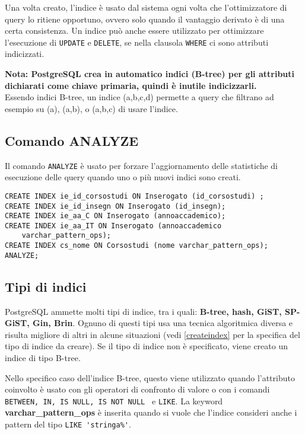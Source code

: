 \documentclass[a4paper, 10pt, titlepage]{article}
\begin{document}
	Una volta creato, l'indice è usato dal sistema ogni volta che l'ottimizzatore di query lo ritiene opportuno, ovvero solo quando il vantaggio derivato è di una certa consistenza. Un indice può anche essere utilizzato per ottimizzare l'esecuzione di \lstinline|UPDATE| e \lstinline|DELETE|, se nella clausola \lstinline|WHERE| ci sono attributi indicizzati.
	
	\noindent
	\textbf{Nota: PostgreSQL crea in automatico indici (B-tree) per gli attributi dichiarati come chiave primaria, quindi è inutile indicizzarli.}\\
	Essendo indici B-tree, un indice (a,b,c,d) permette a query che filtrano ad esempio su (a), (a,b), o (a,b,c) di usare l'indice.
	
	\subsection{Comando ANALYZE}
	Il comando \lstinline|ANALYZE| è usato per forzare l'aggiornamento delle statistiche di esecuzione delle query quando uno o più nuovi indici sono creati.
	\begin{lstlisting}
CREATE INDEX ie_id_corsostudi ON Inserogato (id_corsostudi) ;
CREATE INDEX ie_id_insegn ON Inserogato (id_insegn);
CREATE INDEX ie_aa_C ON Inserogato (annoaccademico);
CREATE INDEX ie_aa_IT ON Inserogato (annoaccademico
	varchar_pattern_ops);
CREATE INDEX cs_nome ON Corsostudi (nome varchar_pattern_ops);
ANALYZE;
	\end{lstlisting}
	
	\subsection{Tipi di indici}
	PostgreSQL ammette molti tipi di indice, tra i quali: \textbf{B-tree, hash, GiST, SP-GiST, Gin, Brin}.
	Ognuno di questi tipi usa una tecnica algoritmica diversa e risulta migliore di altri in alcune situazioni (vedi \ref{createindex} per la specifica del tipo di indice da creare).
	Se il tipo di indice non è specificato, viene creato un indice di tipo B-tree.
	
	 Nello specifico caso dell'indice B-tree, questo viene utilizzato quando l'attributo coinvolto è usato con gli operatori di confronto di valore o con i comandi \lstinline|BETWEEN, IN, IS NULL, IS NOT NULL | e \lstinline|LIKE|.
	 La keyword \textbf{varchar\_pattern\_ops} è inserita quando si vuole che l'indice consideri anche i pattern del tipo \lstinline|LIKE 'stringa%'|.
	 
\end{document}
